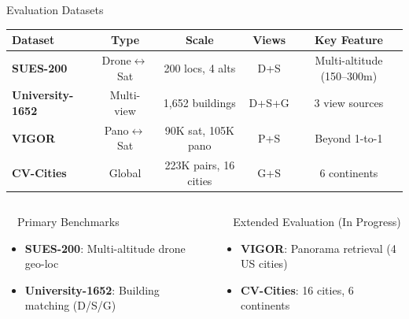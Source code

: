 \documentclass[aspectratio=169, 11pt]{beamer}
\begin{document}
\begin{frame}{Evaluation Datasets}
\footnotesize
\centering
\begin{tabular}{@{}l c c c c@{}}
  \toprule
  \textbf{Dataset} & \textbf{Type} & \textbf{Scale} & \textbf{Views} & \textbf{Key Feature} \\
  \midrule
  \textbf{SUES-200} & Drone$\leftrightarrow$Sat & 200 locs, 4 alts & D+S & Multi-altitude (150--300m) \\
  \textbf{University-1652} & Multi-view & 1,652 buildings & D+S+G & 3 view sources \\
  \textbf{VIGOR} & Pano$\leftrightarrow$Sat & 90K sat, 105K pano & P+S & Beyond 1-to-1 \\
  \textbf{CV-Cities} & Global & 223K pairs, 16 cities & G+S & 6 continents \\
  \bottomrule
\end{tabular}

\vspace{0.4cm}
\normalsize
\begin{columns}[T]
\begin{block}{\faDatabase\ \ Primary Benchmarks}
\begin{itemize}
  \item \textbf{SUES-200}: Multi-altitude drone geo-loc
  \item \textbf{University-1652}: Building matching (D/S/G)
\end{itemize}
\end{block}

\begin{block}{\faGlobe\ \ Extended Evaluation (In Progress)}
\begin{itemize}
  \item \textbf{VIGOR}: Panorama retrieval (4 US cities)
  \item \textbf{CV-Cities}: 16 cities, 6 continents
\end{itemize}
\end{block}
\end{columns}
\end{frame}
\end{document}
